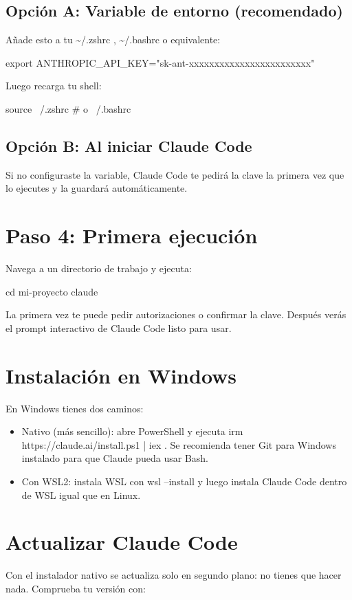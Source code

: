 \documentclass[11pt,a4paper]{book}
\begin{document}
\subsection{Opción A: Variable de entorno (recomendado)}
Añade esto a tu \textasciitilde{}/.zshrc , \textasciitilde{}/.bashrc o equivalente:

\begin{codebox}
export ANTHROPIC_API_KEY="sk-ant-xxxxxxxxxxxxxxxxxxxxxxxx"
\end{codebox}
Luego recarga tu shell:

\begin{codebox}
source ~/.zshrc   # o ~/.bashrc
\end{codebox}
\subsection{Opción B: Al iniciar Claude Code}
Si no configuraste la variable, Claude Code te pedirá la clave la primera vez que lo ejecutes y la guardará automáticamente.

\section{Paso 4: Primera ejecución}
Navega a un directorio de trabajo y ejecuta:

\begin{codebox}
cd mi-proyecto
claude
\end{codebox}
La primera vez te puede pedir autorizaciones o confirmar la clave. Después verás el prompt interactivo de Claude Code listo para usar.

\section{Instalación en Windows}
En Windows tienes dos caminos:

\begin{itemize}\item Nativo (más sencillo): abre PowerShell y ejecuta irm https://claude.ai/install.ps1 | iex . Se recomienda tener Git para Windows instalado para que Claude pueda usar Bash.\end{itemize}
\begin{itemize}\item Con WSL2: instala WSL con wsl --install y luego instala Claude Code dentro de WSL igual que en Linux.\end{itemize}
\section{Actualizar Claude Code}
Con el instalador nativo se actualiza solo en segundo plano: no tienes que hacer nada. Comprueba tu versión con:
\end{document}

